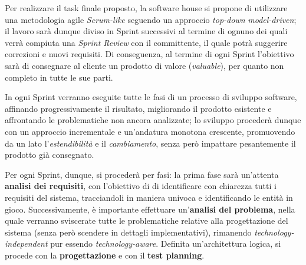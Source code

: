 
Per realizzare il task finale proposto, la software house si propone di utilizzare una metodologia agile \textit{Scrum-like}
seguendo un approccio \textit{top-down} \textit{model-driven};
il lavoro sarà dunque diviso in Sprint successivi al termine di ognuno dei quali verrà compiuta una \textit{Sprint Review}
con il committente, il quale potrà suggerire correzioni e nuovi requisiti.
Di conseguenza, al termine di ogni Sprint l'obiettivo sarà di consegnare al cliente un prodotto di valore (\textit{valuable}),
per quanto non completo in tutte le sue parti.

In ogni Sprint verranno eseguite tutte le fasi di un processo di sviluppo software, affinando progressivamente il risultato,
migliorando il prodotto esistente e affrontando le problematiche non ancora analizzate;
lo sviluppo procederà dunque con un approccio incrementale e un'andatura monotona crescente, promuovendo da un lato
l'\textit{estendibilità} e il \textit{cambiamento}, senza però impattare pesantemente il prodotto già consegnato.

Per ogni Sprint, dunque, si procederà per fasi:
la prima fase sarà un'attenta \textbf{analisi dei requisiti}, con l'obiettivo di di identificare con chiarezza
tutti i requisiti del sistema, tracciandoli in maniera univoca e identificando le entità in gioco.
Successivamente, è importante effettuare un'\textbf{analisi del problema}, nella quale verranno sviscerate tutte le problematiche
relative alla progettazione del sistema (senza però scendere in dettagli implementativi),
rimanendo \textit{technology-independent} pur essendo \textit{technology-aware}.
Definita un'architettura logica, si procede con la \textbf{progettazione} e con il \textbf{test planning}.
